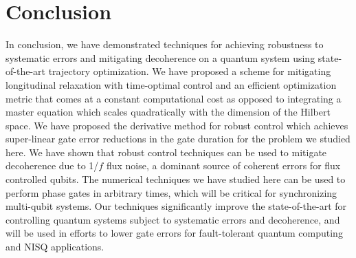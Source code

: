 \section{Conclusion}
In conclusion, we have demonstrated techniques for achieving robustness to systematic
errors and mitigating decoherence on a quantum system using state-of-the-art trajectory
optimization. We have proposed a scheme for mitigating longitudinal relaxation with time-optimal
control and an efficient optimization metric that comes at a constant computational cost as
opposed to integrating a master equation which scales quadratically with
the dimension of the Hilbert space.
We have proposed the derivative method for robust control which achieves
super-linear gate error reductions in the gate duration for the problem we studied here.
We have shown that robust control techniques can be used to mitigate decoherence due
to 1/$f$ flux noise, a dominant source of coherent errors for flux controlled qubits.
The numerical techniques we have studied here can be used to perform phase gates in arbitrary times,
which will be critical for synchronizing multi-qubit systems. Our
techniques significantly improve the state-of-the-art for controlling quantum systems subject
to systematic errors and decoherence, and will be used in efforts to lower gate errors
for fault-tolerant quantum computing and NISQ applications.
